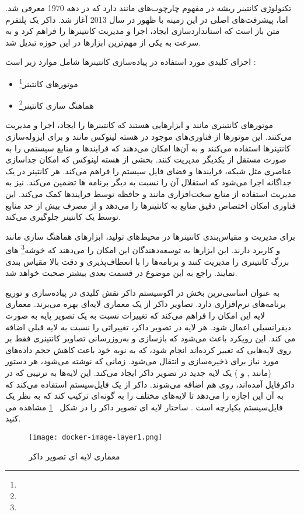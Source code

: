 تکنولوژی کانتینر ریشه در مفهوم چارچوب‌های  مانند  دارد که در دهه 1970 معرفی شد. اما، پیشرفت‌های اصلی در این زمینه با ظهور  در سال 2013 آغاز شد. داکر یک پلتفرم متن باز است که استاندارد‌سازی ایجاد، اجرا و مدیریت کانتینرها را فراهم کرد و به سرعت به یکی از مهم‌ترین ابزارها در این حوزه تبدیل شد.

اجزای کلیدی مورد استفاده در پیاده‌سازی کانتینرها شامل موارد زیر است \cite{Docker2}:
\begin{itemize}
	\item 
	موتورهای کانتینر\footnote{}
	\item
	هماهنگ سازی کانتینر\footnote{}
\end{itemize}


موتورهای کانتینری مانند  و  ابزارهایی هستند که کانتینرها را ایجاد، اجرا و مدیریت می‌کنند. این موتورها از فناوری‌های موجود در هسته لینوکس مانند  و  برای ایزوله‌سازی کانتینرها استفاده می‌کنند و به آن‌ها امکان می‌دهند که فرایندها و منابع سیستمی را به صورت مستقل از یکدیگر مدیریت کنند.  بخشی از هسته لینوکس که امکان جداسازی عناصری مثل شبکه، فرایندها و فضای فایل سیستم را فراهم می‌کند. هر کانتینر در یک  جداگانه اجرا می‌شود که استقلال آن را نسبت به دیگر برنامه ها تضمین می‌کند.  نیز به مدیریت استفاده از منابع سخت‌افزاری مانند  و حافظه توسط فرایندها کمک می‌کند. این فناوری امکان اختصاص دقیق منابع به کانتینرها را می‌دهد و از مصرف بیش از حد منابع توسط یک کانتینر جلوگیری می‌کند.

برای مدیریت و مقیاس‌بندی کانتینرها در محیط‌های تولید، ابزارهای هماهنگ سازی مانند  و  کاربرد دارند. این ابزارها به توسعه‌دهندگان این امکان را می‌دهند که خوشه\footnote{} های  بزرگ کانتینری را مدیریت کنند و برنامه‌ها را با انعطاف‌پذیری و دقت بالا مقیاس بندی نمایند. راجع به این موضوع در قسمت بعدی بیشتر صحبت خواهد شد.


 به عنوان اساسی‌ترین بخش در اکوسیستم داکر نقش کلیدی در پیاده‌سازی و توزیع برنامه‌های نرم‌افزاری دارد. تصاویر داکر از یک معماری لایه‌ای بهره می‌برند. معماری لایه این امکان را فراهم می‌کند که تغییرات نسبت به یک تصویر پایه به صورت دیفرانسیلی اعمال شود. هر لایه در تصویر داکر، تغییراتی را نسبت به لایه قبلی اضافه می کند. این رویکرد باعث می‌شود که بازسازی و به‌روزرسانی تصاویر کانتینری فقط بر روی لایه‌هایی که تغییر کرده‌اند انجام شود، که به نوبه خود باعث کاهش حجم داده‌های مورد نیاز برای ذخیره‌سازی و انتقال می‌شود. زمانی که  نوشته می‌شود، هر دستور (مانند ,  و ) یک لایه جدید در تصویر داکر ایجاد می‌کند. این لایه‌ها به ترتیبی که در داکرفایل آمده‌اند، روی هم اضافه می‌شوند. داکر از یک فایل‌سیستم  استفاده می‌کند که به آن این اجازه را می‌دهد تا لایه‌های مختلف را به گونه‌ای ترکیب کند که به نظر یک فایل‌سیستم یکپارچه است \cite{Docker1}. ساختار لایه ای تصویر داکر را در شکل 
~\ref{fig: docker image layer}
 مشاهده می کنید.
\begin{figure}[t]
	\centering
	\texttt{[image: docker-image-layer1.png]}
	\caption{معماری لایه ای تصویر داکر}
	\label{fig: docker image layer}
\end{figure}

